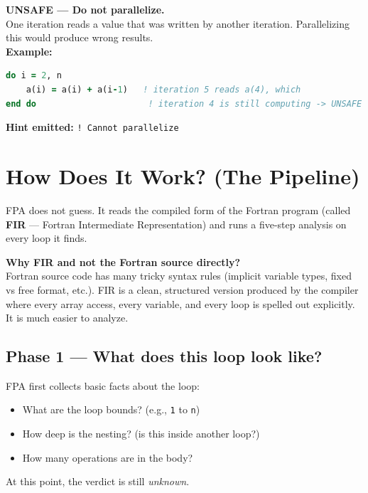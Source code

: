 \documentclass[12pt,a4paper]{article}
\begin{document}
\vspace{6pt}
\begin{unsafebox}
\textbf{\color{unsafered}UNSAFE --- Do not parallelize.}\\
One iteration reads a value that was written by another iteration.
Parallelizing this would produce wrong results.\\[4pt]
\textbf{Example:}
\begin{lstlisting}[language=Fortran]
do i = 2, n
    a(i) = a(i) + a(i-1)   ! iteration 5 reads a(4), which
end do                      ! iteration 4 is still computing -> UNSAFE
\end{lstlisting}
\textbf{Hint emitted:} \texttt{! Cannot parallelize}
\end{unsafebox}

\section{How Does It Work? (The Pipeline)}

FPA does not guess. It reads the compiled form of the Fortran program
(called \textbf{FIR} --- Fortran Intermediate Representation) and runs
a five-step analysis on every loop it finds.

\begin{infobox}
\textbf{Why FIR and not the Fortran source directly?}\\
Fortran source code has many tricky syntax rules (implicit variable
types, fixed vs free format, etc.). FIR is a clean, structured version
produced by the compiler where every array access, every variable, and
every loop is spelled out explicitly. It is much easier to analyze.
\end{infobox}

\subsection{Phase 1 --- What does this loop look like?}

FPA first collects basic facts about the loop:
\begin{itemize}[leftmargin=1.5em]
  \item What are the loop bounds? (e.g., \texttt{1} to \texttt{n})
  \item How deep is the nesting? (is this inside another loop?)
  \item How many operations are in the body?
\end{itemize}
At this point, the verdict is still \textit{unknown}.
\end{document}
